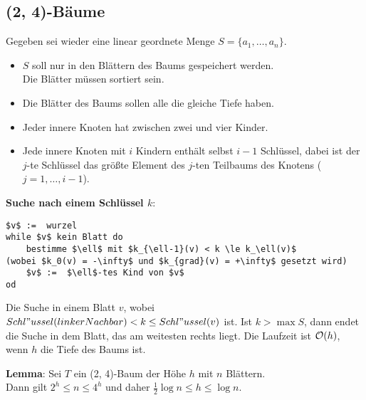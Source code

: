 \subsection{%
    (2, 4)-Bäume
}

Gegeben sei wieder eine linear geordnete Menge $S = \{a_1, \dotsc, a_n\}$.
\begin{itemize}
    \item
    $S$ soll nur in den Blättern des Baums gespeichert werden. \\
    Die Blätter müssen sortiert sein.

    \item
    Die Blätter des Baums sollen alle die gleiche Tiefe haben.

    \item
    Jeder innere Knoten hat zwischen zwei und vier Kinder.

    \item
    Jede innere Knoten mit $i$ Kindern enthält selbst $i - 1$ Schlüssel,
    dabei ist der $j$-te Schlüssel das größte Element des $j$-ten Teilbaums
    des Knotens ($j = 1, \dotsc, i - 1$).
\end{itemize}

\linie

\textbf{Suche nach einem Schlüssel $k$}:
\begin{lstlisting}
$v$ :=  wurzel
while $v$ kein Blatt do
    bestimme $\ell$ mit $k_{\ell-1}(v) < k \le k_\ell(v)$                              (wobei $k_0(v) = -\infty$ und $k_{grad}(v) = +\infty$ gesetzt wird)
    $v$ :=  $\ell$-tes Kind von $v$
od
\end{lstlisting}

Die Suche in einem Blatt $v$, wobei
$Schl"ussel(linkerNachbar) < k \le Schl"ussel(v)$ ist.
Ist $k > \max S$, dann endet die Suche in dem Blatt, das am weitesten rechts
liegt.
Die Laufzeit ist $\mathcal{O}(h)$, wenn $h$ die Tiefe des Baums ist.

\pagebreak

\textbf{Lemma}: Sei $T$ ein (2, 4)-Baum der Höhe $h$ mit $n$ Blättern. \\
Dann gilt $2^h \le n \le 4^h$ und daher $\frac{1}{2} \log n \le h \le \log n$.

\linie

